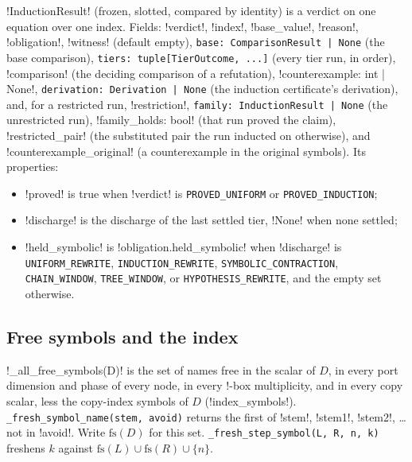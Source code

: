 \begin{definition}\label{def:kernel-result}
\py!InductionResult! (frozen, slotted, compared by identity) is a verdict on one equation over one index. Fields: \py!verdict!, \py!index!, \py!base_value!, \py!reason!, \py!obligation!, \py!witness! (default empty), \texttt{base: ComparisonResult | None} (the base comparison), \texttt{tiers: tuple[TierOutcome,\allowbreak{} .\allowbreak{}.\allowbreak{}.\allowbreak{}]} (every tier run, in order), \py!comparison! (the deciding comparison of a refutation), \py!counterexample: int | None!, \texttt{derivation: Derivation | None} (the induction certificate's derivation), and, for a restricted run, \py!restriction!, \texttt{family: InductionResult | None} (the unrestricted run), \py!family_holds: bool! (that run proved the claim), \py!restricted_pair! (the substituted pair the run inducted on otherwise), and \py!counterexample_original! (a counterexample in the original symbols). Its properties:
\begin{itemize}
\item \py!proved! is true when \py!verdict! is \texttt{PROVED\_UNIFORM} or \texttt{PROVED\_INDUCTION};
\item \py!discharge! is the discharge of the last settled tier, \py!None! when none settled;
\item \py!held_symbolic! is \py!obligation.held_symbolic! when \py!discharge! is \texttt{UNIFORM\_REWRITE}, \texttt{INDUCTION\_REWRITE}, \texttt{SYMBOLIC\_CONTRACTION}, \texttt{CHAIN\_WINDOW}, \texttt{TREE\_WINDOW}, or \texttt{HYPOTHESIS\_REWRITE}, and the empty set otherwise.
\end{itemize}
\end{definition}

\subsection{Free symbols and the index}\label{sec:kernel-index}

\py!_all_free_symbols(D)! is the set of names free in the scalar of $D$, in every port dimension and phase of every node, in every !-box multiplicity, and in every copy scalar, less the copy-index symbols of $D$ (\py!index_symbols!). \texttt{\_\allowbreak{}fresh\_\allowbreak{}symbol\_\allowbreak{}name(\allowbreak{}stem,\allowbreak{} avoid)} returns the first of \code!stem!, \code!stem1!, \code!stem2!, \ldots{} not in \code!avoid!. Write $\mathrm{fs}(D)$ for this set. \texttt{\_\allowbreak{}fresh\_\allowbreak{}step\_\allowbreak{}symbol(\allowbreak{}L,\allowbreak{} R,\allowbreak{} n,\allowbreak{} k)} freshens $k$ against $\mathrm{fs}(L)\cup\mathrm{fs}(R)\cup\{n\}$.

